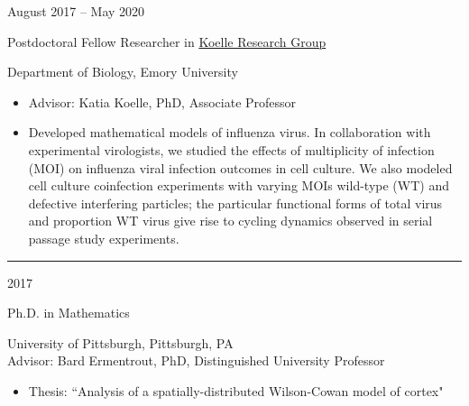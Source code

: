 \documentclass[a4paper,10pt]{article}
\newlength{\cvcolumngapwidth}
\newlength{\cvleftcolumnwidth}
\newlength{\cvrightcolumnwidth}
\newcommand{\cvsectionstyle}[1]{{\normalsize\cvsectionfont\textcolor{cvsectioncolor}{#1}}}
\newcommand{\cvtitlestyle}[1]{{\large\cvtitlefont\textcolor{cvtitlecolor}{#1}}}
\newcommand{\cvdurationstyle}[1]{{\small\cvdurationfont\textcolor{cvdurationcolor}{#1}}}
\newlength{\cvafteritemskipamount}
\newlength{\cvaftersectionskipamount}
\newlength{\cvbetweensectionandheadingextraskipamount}
\newlength{\cvaftertitleskipamount}
\newlength{\cvparskip}
\newcommand{\cvsection}[1]{
            \begin{minipage}[t]{\cvleftcolumnwidth}
                \raggedleft\cvsectionstyle{#1}
            \end{minipage}%
            \hspace{\cvcolumngapwidth}%
            \begin{minipage}[t]{\cvrightcolumnwidth}
                \textcolor{cvrulecolor}{\rule{\cvrightcolumnwidth}{0.3mm}}
            \end{minipage}
        
            \vspace{\cvaftersectionskipamount}
        }
\newcommand{\cvitem}[2]{
            \begin{minipage}[t]{\cvleftcolumnwidth}
                \raggedleft #1
            \end{minipage}%
            \hspace{\cvcolumngapwidth}%
            \begin{minipage}[t]{\cvrightcolumnwidth}
                \setlength{\parskip}{\cvparskip} #2
            \end{minipage}
        
            \vspace{\cvafteritemskipamount}
        }
\newcommand{\cvtitle}[1]{
            \cvtitlestyle{#1}
        
            \vspace{\cvaftertitleskipamount}
            \vspace{-\cvparskip}
        }
\begin{document}
        \cvitem{
            \cvdurationstyle{August 2017 -- May 2020}
        }{
            \cvtitle{Postdoctoral Fellow Researcher in \href{https://scholarblogs.emory.edu/koellelab/}{Koelle Research Group}}
        
        	Department of Biology, Emory University %
        
            \begin{itemize}[leftmargin=*]
            	\item Advisor: Katia Koelle, PhD, Associate Professor
                \item Developed mathematical models of influenza virus. In collaboration with experimental virologists, we studied the effects of multiplicity of infection (MOI) on influenza viral infection outcomes in cell culture. We also modeled cell culture coinfection experiments with varying MOIs wild-type (WT) and defective interfering particles; the particular functional forms of total virus and proportion WT virus give rise to cycling dynamics observed in serial passage study experiments. 
        
            \end{itemize}
        }
        
        
        
        
        \cvsection{EDUCATION}
        \vspace{\cvbetweensectionandheadingextraskipamount}
        
        \cvitem{
            \cvdurationstyle{2017}
        }{
            \cvtitle{Ph.D. in Mathematics}
        	
        	University of Pittsburgh, Pittsburgh, PA \\
            	Advisor: Bard Ermentrout, PhD, Distinguished University Professor
        
            \begin{itemize}[leftmargin=*]
                \item Thesis: ``Analysis of a spatially-distributed Wilson-Cowan model of cortex"
            \end{itemize}
        }
        
\end{document}
